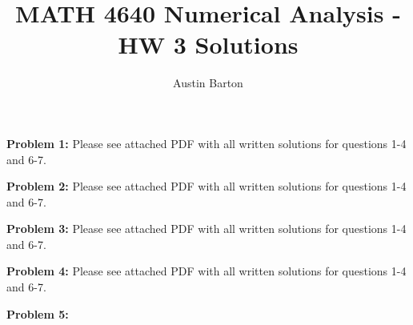 \documentclass[12pt, letterpaper]{article}
\title{MATH 4640 Numerical Analysis - HW 3 Solutions}
\author{Austin Barton}
\theoremstyle{nonumberplain}
\begin{document}
\maketitle

\vspace{2em}

\hspace{18pt}\textbf{Problem 1:} \medskip
Please see attached PDF with all written solutions for questions 1-4 and 6-7.

\hspace{18pt}\textbf{Problem 2:} \medskip
Please see attached PDF with all written solutions for questions 1-4 and 6-7.

\hspace{18pt}\textbf{Problem 3:} \medskip
Please see attached PDF with all written solutions for questions 1-4 and 6-7.

\hspace{18pt}\textbf{Problem 4:} \medskip
Please see attached PDF with all written solutions for questions 1-4 and 6-7.

\hspace{18pt}\textbf{Problem 5:} \medskip
\end{document}
